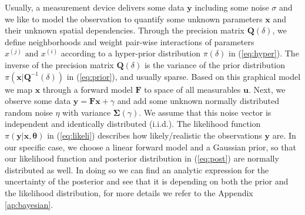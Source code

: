 Usually, a measurement device delivers some data $\bm{y}$ including some noise $\sigma$ and we like to model the observation to quantify some unknown parameters $\bm{x}$ and their unknown spatial dependencies.
Through the precision matrix $\bm{Q}(\delta)$, we define neighborhoods and weight pair-wise interactions of parameters $x^{(j)} \text{ and } x^{(i)}$ according to a hyper-prior distribution $\pi ( \delta ) $ in (\ref{eq:hyper}).
The inverse of the precision matrix $\bm{Q}( \delta ) $ is the variance of the prior distribution $\pi(\bm{x} |  \bm{Q}^{-1}( \delta ) )$ in (\ref{eq:prior}), and usually sparse.
Based on this graphical model we map $\bm{x}$ through a forward model $\bm{F}$  to space of all measurables $\bm{u}$.
Next, we observe some data $\bm{y} = \bm{F} \bm{x} + \gamma$ and add some unknown normally distributed random noise $\eta$ with variance $\bm{\Sigma}(\gamma)$.
We assume that this noise vector is independent and identically distributed (i.i.d.).
The likelihood function $\pi( \bm{y} | \bm{x, \theta} )$ in (\ref{eq:likeli}) describes how likely/realistic the observations $\bm{y}$ are.
In our specific case, we choose a linear forward model and a Gaussian prior, so that our likelihood function and posterior distribution in (\ref{eq:post}) are normally distributed as well.
In doing so we can find an analytic expression for the uncertainty of the posterior and see that it is depending on both the prior and the likelihood distribution, for more details we refer to the Appendix \ref{ap:bayesian}.

